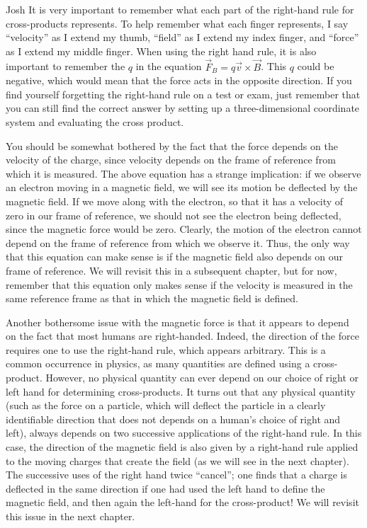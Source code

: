 \begin{studentOpinion}{Josh}{}
It is very important to remember what each part of the right-hand rule for cross-products represents. To help remember what each finger represents, I say ``velocity'' as I extend my thumb, ``field'' as I extend my index finger, and ``force'' as I extend my middle finger. When using the right hand rule, it is also important to remember the $q$ in the equation $\vec F_B = q\vec v \times \vec B$. This $q$ could be negative, which would mean that the force acts in the opposite direction.
If you find yourself forgetting the right-hand rule on a test or exam, just remember that you can still find the correct answer by setting up a three-dimensional coordinate system and evaluating the cross product.
\end{studentOpinion}
You should be somewhat bothered by the fact that the force depends on the velocity of the charge, since velocity depends on the frame of reference from which it is measured. The above equation has a strange implication: if we observe an electron moving in a magnetic field, we will see its motion be deflected by the magnetic field. If we move along with the electron, so that it has a velocity of zero in our frame of reference, we should not see the electron being deflected, since the magnetic force would be zero. Clearly, the motion of the electron cannot depend on the frame of reference from which we observe it. Thus, the only way that this equation can make sense is if the magnetic field also depends on our frame of reference. We will revisit this in a subsequent chapter, but for now, remember that this equation only makes sense if the velocity is measured in the same reference frame as that in which the magnetic field is defined.

Another bothersome issue with the magnetic force is that it appears to depend on the fact that most humans are right-handed. Indeed, the direction of the force requires one to use the right-hand rule, which appears arbitrary. This is a common occurrence in physics, as many quantities are defined using a cross-product. However, no physical quantity can ever depend on our choice of right or left hand for determining cross-products. It turns out that any physical quantity (such as the force on a particle, which will deflect the particle in a clearly identifiable direction that does not depends on a human's choice of right and left), always depends on two successive applications of the right-hand rule. In this case, the direction of the magnetic field is also given by a right-hand rule applied to the moving charges that create the field (as we will see in the next chapter). The successive uses of the right hand twice ``cancel''; one finds that a charge is deflected in the same direction if one had used the left hand to define the magnetic field, and then again the left-hand for the cross-product! We will revisit this issue in the next chapter.

